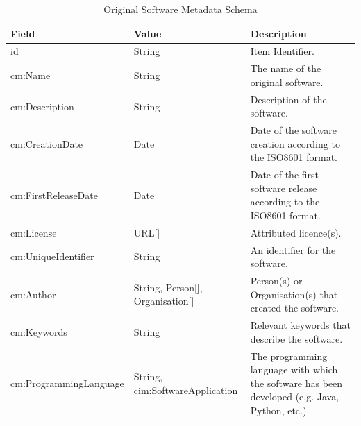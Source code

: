 \begin{longtable}{|p{}|p{}|p{}|}
    \caption{Original Software Metadata Schema} \label{tab:c4-original-software} \\
    \hline
    \textbf{Field} & \textbf{Value} & \textbf{Description} \\
    \hline

    \scriptsize id                                    & \scriptsize String                         & \scriptsize Item Identifier. \\
    \hline
    \scriptsize cm:Name                               & \scriptsize String                         & \scriptsize The name of the original software. \\
    \hline
    \scriptsize cm:Description                        & \scriptsize String                         & \scriptsize Description of the software. \\
    \hline
    \scriptsize cm:CreationDate                       & \scriptsize Date                           & \scriptsize Date of the software creation according to the ISO8601 format. \\
    \hline
   \scriptsize  cm:FirstReleaseDate                   & \scriptsize Date                           & \scriptsize Date of the first software release according to the ISO8601 format. \\
    \hline
    \scriptsize cm:License                            & \scriptsize URL[]                          & \scriptsize Attributed licence(s). \\
    \hline
    \scriptsize cm:UniqueIdentifier                   & \scriptsize String                         & \scriptsize An identifier for the software. \\
    \hline
    \scriptsize cm:Author                             & \scriptsize String, \textcolor{uniudColor3}{Person}[], \textcolor{uniudColor3}{Organisation}[]        & \scriptsize Person(s) or Organisation(s) that created the software. \\
    \hline
    \scriptsize cm:Keywords                           & \scriptsize String                         & \scriptsize Relevant keywords that describe the software. \\
    \hline
    \scriptsize cm:ProgrammingLanguage                & \scriptsize String, \textcolor{uniudColor3}{cim:SoftwareApplication} & \scriptsize The programming language with which the software has been developed (e.g. Java, Python, etc.). \\

\end{longtable}
